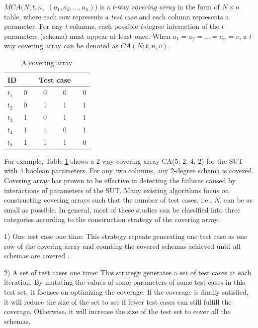 \documentclass[journal,12pt,onecolumn,draftclsnofoot,]{IEEEtran}
\begin{document}
\begin{definition} $MCA(N; t, n,$ $(a_{1}, a_{2}, ..., a_{n})$) is a $t$-way \emph{covering array} in the form of $N \times n$ table, where each row represents a \emph{test case} and each column represents a parameter.  For any \emph{t} columns, each possible \emph{t}-degree interaction of the $t$ parameters (schema) must appear at least once. When $ a_{1} = a_{2} = ... = a_{n} = v $, a $t$-way covering array can be denoted as $CA(N; t, n, v)$.
\end{definition}

\begin{table}[!ht]
\renewcommand{\arraystretch}{1.3}
\caption{A covering array}
\label{ca_example}
\centering
\begin{tabular}{l|llll}
 \hline
ID &\multicolumn{4}{c}{\bfseries Test case} \\  \hline
$t_{1}$ &\multicolumn{4}{l}{0  \ \ \ \  0 \ \ \ \  0 \ \ \ \ 0} \\
$t_{2}$ &\multicolumn{4}{l}{0  \ \ \ \  1 \ \ \ \  1 \ \ \ \ 1} \\
$t_{3}$ &\multicolumn{4}{l}{1  \ \ \ \  0 \ \ \ \  1 \ \ \ \ 1} \\
$t_{4}$ &\multicolumn{4}{l}{1  \ \ \ \  1 \ \ \ \  0 \ \ \ \ 1} \\
$t_{5}$ &\multicolumn{4}{l}{1  \ \ \ \  1 \ \ \ \  1 \ \ \ \ 0} \\
 \hline
\end{tabular}
\end{table}

For example, Table \ref{ca_example} shows a 2-way covering array CA(5; 2, 4, 2) for the SUT with 4 boolean parameters. For any two columns, any 2-degree schema is covered. Covering array has proven to be effective in detecting the failures caused by interactions of parameters of the SUT. Many existing algorithms focus on constructing covering arrays such that the number of test cases, i.e., $N$, can be as small as possible. In general, most of these studies can be classified into three categories according to the construction strategy of the covering array\cite{nie2011survey}:

1) One test case one time: This strategy repeats generating one test case as one row of the covering array and counting the covered schemas achieved until all schemas are covered \cite{cohen1997aetg,bryce2007density,tung2000automating}.


2) A  set of test cases one time:  This strategy generates a set of test cases at each iteration. By mutating the values of some parameters of some test cases in this test set, it focuses on optimizing the coverage. If the coverage is finally satisfied, it will reduce the size of the set to see if fewer test cases can still fulfill the coverage. Otherwise, it will increase the size of the test set to cover all the schemas\cite{cohen2003augmenting,nurmela2004upper}.
\end{document}
